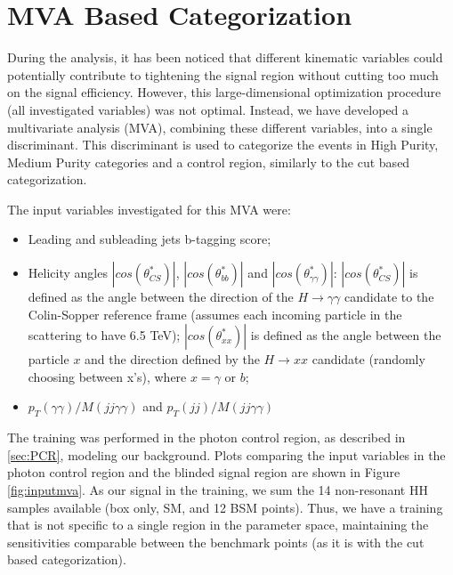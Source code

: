 \section{MVA Based Categorization}
\label{sec:cats}

During the analysis, it has been noticed that different kinematic variables could potentially contribute to tightening the signal region without cutting too much on the signal efficiency. 
However, this large-dimensional optimization procedure (all investigated variables) was not optimal. 
Instead, we have developed a multivariate analysis (MVA), combining these different variables, into a single discriminant. 
This discriminant is used to categorize the events in High Purity, Medium Purity categories and a control region, similarly to the cut based categorization. 

The input variables investigated for this MVA were:
\begin{itemize}
\item Leading and subleading jets b-tagging score;
\item Helicity angles $|cos(\theta^{*}_{CS})|$, $|cos(\theta^{*}_{bb})|$ and $|cos(\theta^{*}_{\gamma\gamma})|$: $|cos(\theta^{*}_{CS})|$ is defined as the angle between the direction of the $H\rightarrow\gamma\gamma$ candidate to the Colin-Sopper reference frame (assumes each incoming particle in the scattering to have 6.5 TeV); $|cos(\theta^{*}_{xx})|$ is defined as the angle between the particle $x$ and the direction defined by the $H\rightarrow x x$ candidate (randomly choosing between x's), where $x = \gamma$ or $b$;
\item $p_{T}(\gamma\gamma)/M(jj\gamma\gamma)$ and $p_{T}(jj)/M(jj\gamma\gamma)$
\end{itemize}

The training was performed in the photon control region, as described in \ref{sec:PCR}, modeling our background. 
Plots comparing the input variables in the photon control region and the blinded signal region are shown in Figure \ref{fig:inputmva}. 
As our signal in the training, we sum the 14 non-resonant HH samples available (box only, SM, and 12 BSM points). 
Thus, we have a training that is not specific to a single region in the parameter space, maintaining the sensitivities comparable between the benchmark points (as it is with the cut based categorization). 

